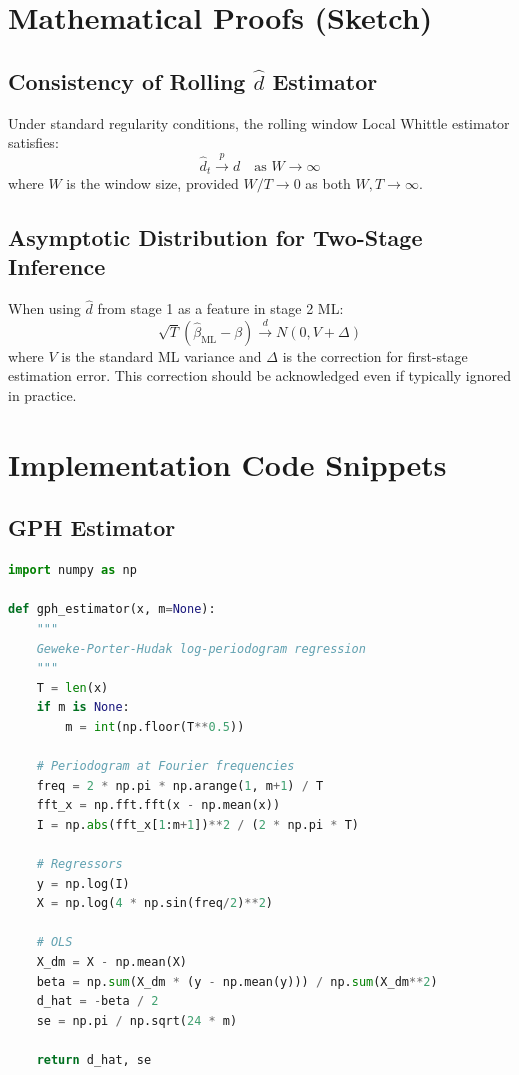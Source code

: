 \documentclass[11pt,a4paper]{article}
\theoremstyle{definition}
\newcommand{\dhat}{\hat{d}}
\begin{document}
\newpage
\appendix

\section{Mathematical Proofs (Sketch)}

\subsection{Consistency of Rolling $\dhat$ Estimator}

Under standard regularity conditions, the rolling window Local Whittle estimator satisfies:
\begin{equation}
    \dhat_t \xrightarrow{p} d \quad \text{as } W \to \infty
\end{equation}
where $W$ is the window size, provided $W/T \to 0$ as both $W, T \to \infty$.

\subsection{Asymptotic Distribution for Two-Stage Inference}

When using $\dhat$ from stage 1 as a feature in stage 2 ML:
\begin{equation}
    \sqrt{T}(\hat{\beta}_{\text{ML}} - \beta) \xrightarrow{d} N(0, V + \Delta)
\end{equation}
where $V$ is the standard ML variance and $\Delta$ is the correction for first-stage estimation error. This correction should be acknowledged even if typically ignored in practice.

\section{Implementation Code Snippets}

\subsection{GPH Estimator}

\begin{lstlisting}[language=Python]
import numpy as np

def gph_estimator(x, m=None):
    """
    Geweke-Porter-Hudak log-periodogram regression
    """
    T = len(x)
    if m is None:
        m = int(np.floor(T**0.5))
    
    # Periodogram at Fourier frequencies
    freq = 2 * np.pi * np.arange(1, m+1) / T
    fft_x = np.fft.fft(x - np.mean(x))
    I = np.abs(fft_x[1:m+1])**2 / (2 * np.pi * T)
    
    # Regressors
    y = np.log(I)
    X = np.log(4 * np.sin(freq/2)**2)
    
    # OLS
    X_dm = X - np.mean(X)
    beta = np.sum(X_dm * (y - np.mean(y))) / np.sum(X_dm**2)
    d_hat = -beta / 2
    se = np.pi / np.sqrt(24 * m)
    
    return d_hat, se
\end{lstlisting}
\end{document}
